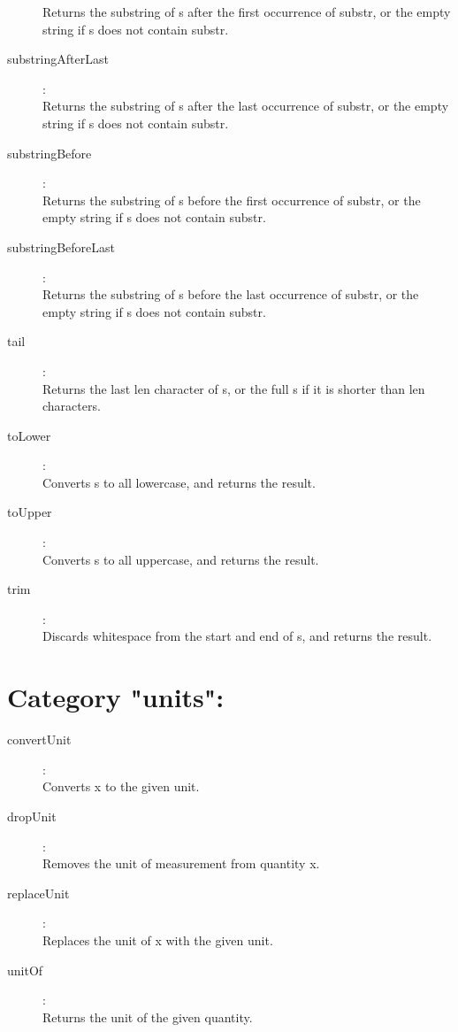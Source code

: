 \begin{description}
    Returns the substring of s after the first occurrence of substr, or the empty string if s does not contain substr.
\item[substringAfterLast]:  \\
    Returns the substring of s after the last occurrence of substr, or the empty string if s does not contain substr.
\item[substringBefore]:  \\
    Returns the substring of s before the first occurrence of substr, or the empty string if s does not contain substr.
\item[substringBeforeLast]:  \\
    Returns the substring of s before the last occurrence of substr, or the empty string if s does not contain substr.
\item[tail]:  \\
    Returns the last len character of s, or the full s if it is shorter than len characters.
\item[toLower]:  \\
    Converts s to all lowercase, and returns the result.
\item[toUpper]:  \\
    Converts s to all uppercase, and returns the result.
\item[trim]:  \\
    Discards whitespace from the start and end of s, and returns the result.

\end{description}

\section{Category "units":}
\label{sec:ned-functions:category-units}

\begin{description}
\item[convertUnit]:  \\
    Converts x to the given unit.
\item[dropUnit]:  \\
    Removes the unit of measurement from quantity x.
\item[replaceUnit]:  \\
    Replaces the unit of x with the given unit.
\item[unitOf]:  \\
    Returns the unit of the given quantity.

\end{description}

